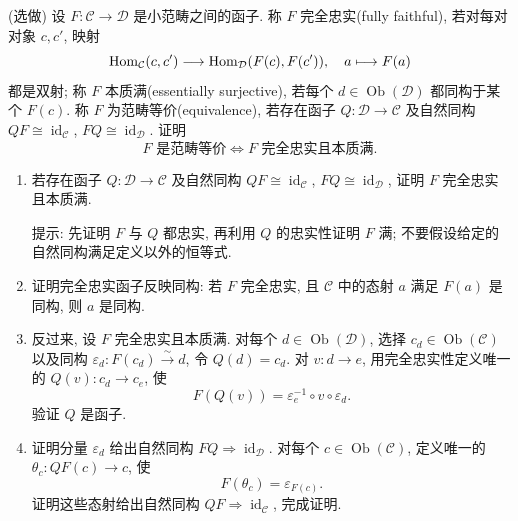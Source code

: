 \documentclass{article}
\begin{document}
\begin{problem}
({\heiti 选做}) 设 $F:\mathcal C\to\mathcal D$ 是小范畴之间的函子. 称 $F$ 完全忠实(fully faithful), 若对每对对象 $c,c'$, 映射
\[
  \operatorname{Hom}_{\mathcal C}(c,c')\longrightarrow\operatorname{Hom}_{\mathcal D}(F(c),F(c')),\quad a\longmapsto F(a)
\]
都是双射; 称 $F$ 本质满(essentially surjective), 若每个 $d\in\operatorname{Ob}(\mathcal D)$ 都同构于某个 $F(c)$. 称 $F$ 为范畴等价(equivalence), 若存在函子 $Q:\mathcal D\to\mathcal C$ 及自然同构 $QF\cong\operatorname{id}_{\mathcal C}$, $FQ\cong\operatorname{id}_{\mathcal D}$. 证明
\[
  F\text{ 是范畴等价}\iff F\text{ 完全忠实且本质满}.
\]
\begin{enumerate}
  \item[(a)] 若存在函子 $Q:\mathcal D\to\mathcal C$ 及自然同构 $QF\cong\operatorname{id}_{\mathcal C}$, $FQ\cong\operatorname{id}_{\mathcal D}$, 证明 $F$ 完全忠实且本质满.

  提示: 先证明 $F$ 与 $Q$ 都忠实, 再利用 $Q$ 的忠实性证明 $F$ 满; 不要假设给定的自然同构满足定义以外的恒等式.
  \item[(b)] 证明完全忠实函子反映同构: 若 $F$ 完全忠实, 且 $\mathcal C$ 中的态射 $a$ 满足 $F(a)$ 是同构, 则 $a$ 是同构.
  \item[(c)] 反过来, 设 $F$ 完全忠实且本质满. 对每个 $d\in\operatorname{Ob}(\mathcal D)$, 选择 $c_d\in\operatorname{Ob}(\mathcal C)$ 以及同构 $\varepsilon_d:F(c_d)\xrightarrow{\sim}d$, 令 $Q(d)=c_d$. 对 $v:d\to e$, 用完全忠实性定义唯一的 $Q(v):c_d\to c_e$, 使
  \[
    F(Q(v))=\varepsilon_e^{-1}\circ v\circ\varepsilon_d.
  \]
  验证 $Q$ 是函子.
  \item[(d)] 证明分量 $\varepsilon_d$ 给出自然同构 $FQ\Rightarrow\operatorname{id}_{\mathcal D}$. 对每个 $c\in\operatorname{Ob}(\mathcal C)$, 定义唯一的 $\theta_c:QF(c)\to c$, 使
  \[
    F(\theta_c)=\varepsilon_{F(c)}.
  \]
  证明这些态射给出自然同构 $QF\Rightarrow\operatorname{id}_{\mathcal C}$, 完成证明.
\end{enumerate}
\end{problem}
\end{document}

